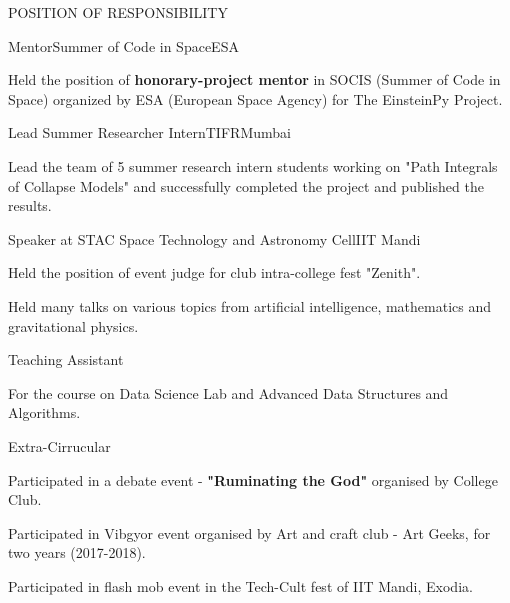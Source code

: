 \documentclass{resume} %
\begin{document}
\newpage
\begin{rSection}{POSITION OF RESPONSIBILITY}
\begin{rSubsection}{Mentor}{}{Summer of Code in Space}{ESA}
\item  Held the position of \textbf{honorary-project mentor} in SOCIS (Summer of
Code in Space) organized by ESA (European Space Agency) for
The EinsteinPy Project.
\end{rSubsection}

\begin{rSubsection}{Lead Summer Researcher Intern}{}{TIFR}{Mumbai}
\item  Lead the team of 5 summer research intern students working on "Path Integrals of Collapse Models" and successfully completed the project and published the results.
\end{rSubsection}

\begin{rSubsection}{Speaker at STAC }{}{Space Technology and Astronomy Cell}{IIT Mandi}
\item Held the position of event judge for club intra-college fest "Zenith".
\item Held many talks on various topics from artificial intelligence, mathematics and gravitational physics.
\end{rSubsection}

\begin{rSubsection}{Teaching Assistant}{}{}{}
\item For the course on Data Science Lab and Advanced Data Structures and Algorithms.
\end{rSubsection}

\end{rSection}

\begin{rSection}{Extra-Cirrucular} \itemsep -3pt
\item Participated in a debate event - \textbf{"Ruminating the God"} organised by College Club.
\item Participated in Vibgyor event organised by Art and craft club - Art Geeks, for two years (2017-2018).
\item Participated in flash mob event in the Tech-Cult fest of IIT Mandi, Exodia.

\end{rSection}
\end{document}
